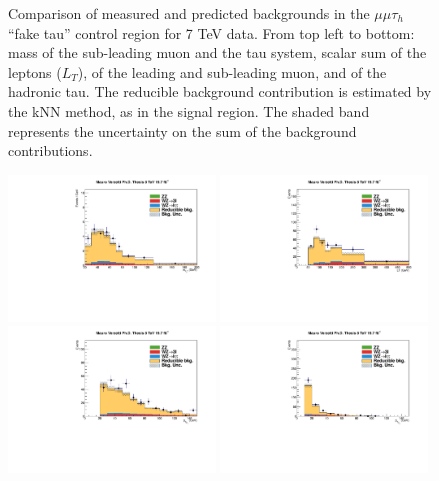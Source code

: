 \begin{figure}
\begin{center}
  \caption{Comparison of measured and predicted backgrounds in the $\mu\mu\tau_h$ ``fake tau'' control region for 7 TeV data.
  From top left to bottom: mass of the sub-leading muon and the tau system, scalar sum of the leptons \pT ($L_T$), \pT of the leading and sub-leading muon, and \pT of the hadronic tau.
  The reducible background contribution is estimated by the kNN method, as in the signal region.
  The shaded band represents the uncertainty on the sum of the background contributions.
  }
  \label{fig:LLT_mmt_f3_control_7TeV}
\end{center}
\end{figure}

\begin{figure}
\begin{center}
  \includegraphics[width=0.49\textwidth]{4_Analisys/pics/8TeV/plots/mmt/f3/Full/final-f3-subMass-Full.pdf}
  \includegraphics[width=0.49\textwidth]{4_Analisys/pics/8TeV/plots/mmt/f3/final-LT.pdf}\\
  \includegraphics[width=0.49\textwidth]{4_Analisys/pics/8TeV/plots/mmt/f3/Full/final-f3-m1Pt-Full.pdf}
  \includegraphics[width=0.49\textwidth]{4_Analisys/pics/8TeV/plots/mmt/f3/Full/final-f3-m2Pt-Full.pdf}\\

\end{center}
\end{figure}
